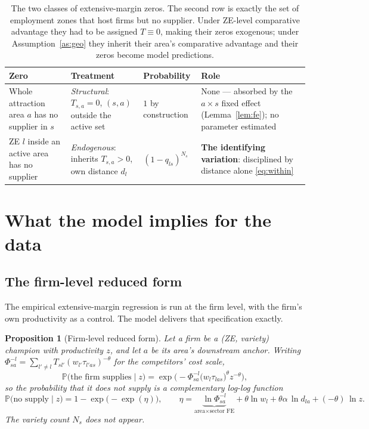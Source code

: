 \documentclass[11pt]{article}
\newtheorem{proposition}{Proposition}
\newcommand{\Prob}{\mathbb{P}}
\begin{document}
\begin{table}[htbp]
\centering
\small
\begin{tabular}{@{}p{}p{}p{}p{}@{}}
\toprule
\textbf{Zero} & \textbf{Treatment} & \textbf{Probability} & \textbf{Role}\\
\midrule
Whole attraction area $a$ has no supplier in $s$
& \emph{Structural}: $T_{s,a}=0$, $(s,a)$ outside the active set
& $1$ by construction
& None --- absorbed by the $a\times s$ fixed effect (Lemma~\ref{lem:fe}); no parameter estimated\\[4pt]
ZE $l$ inside an active area has no supplier
& \emph{Endogenous}: inherits $T_{s,a}>0$, own distance $d_{l}$
& $(1-q_{ls})^{N_{s}}$
& \textbf{The identifying variation}: disciplined by distance alone \eqref{eq:within}\\
\bottomrule
\end{tabular}
\caption{The two classes of extensive-margin zeros. The second row is exactly the set of
employment zones that host firms but no supplier. Under ZE-level comparative advantage they had to
be assigned $T\equiv0$, making their zeros exogenous; under Assumption~\ref{as:geo} they inherit
their area's comparative advantage and their zeros become model predictions.}
\label{tab:hierarchy}
\end{table}

\section{What the model implies for the data}
\label{sec:reduced}

\subsection{The firm-level reduced form}

The empirical extensive-margin regression is run at the firm level, with the firm's own
productivity as a control. The model delivers that specification exactly.

\begin{proposition}[Firm-level reduced form]
\label{prop:firm}
Let a firm be a (ZE, variety) champion with productivity $z$, and let $a$ be its area's downstream
anchor. Writing $\Phi^{-l}_{sa}=\sum_{l'\neq l}T_{sl'}(w_{l'}\tau_{l'as})^{-\theta}$ for the
competitors' cost scale,
\begin{equation}
\Prob\big(\text{the firm supplies}\mid z\big)=\exp\!\Big(-\Phi^{-l}_{sa}\big(w_{l}\tau_{las}\big)^{\theta}z^{-\theta}\Big),
\label{eq:firm-win}
\end{equation}
so the probability that it does \emph{not} supply is a complementary log-log function
\begin{equation}
\Prob\big(\text{no supply}\mid z\big)=1-\exp\!\big(-\exp(\eta)\big),
\qquad
\eta=\underbrace{\ln\Phi^{-l}_{sa}}_{\text{area}\times\text{sector FE}}
+\theta\ln w_{l}
+\boxed{\theta\alpha}\,\ln d_{la}
+\boxed{(-\theta)}\,\ln z .
\label{eq:firm-cloglog}
\end{equation}
The variety count $N_{s}$ does not appear.
\end{proposition}
\end{document}

